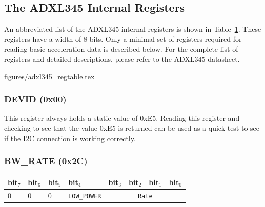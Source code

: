 \documentclass[11pt, twoside, pdftex]{article}
\begin{document}

\subsection{The ADXL345 Internal Registers}
\label{sec:adxl345_internal_registers}

An abbreviated list of the ADXL345 internal registers is shown in Table~\hyperref[tab:adxl345regtable]{1}. These registers have a width of 8 bits. Only a minimal set of registers required for reading basic acceleration data is described below. For the complete list of registers and detailed descriptions, please refer to the ADXL345 datasheet. 


 {figures/adxl345_regtable.tex}

\subsubsection{DEVID (0x00)}

This register always holds a static value of 0xE5. Reading this register and checking to see that the value 0xE5 is returned can be used as a quick test to see if the I2C connection is working correctly.

\subsubsection{BW\_RATE (0x2C)}

\begin{table}[h]
    \centering
    \begin{tabular}{|l|l|l|l|l|l|l|l|}
        \hline
            \textbf{bit$_7$}
            & \textbf{bit$_6$}
            & \textbf{bit$_5$}
            & \textbf{bit$_4$}
            & \textbf{bit$_3$}
            & \textbf{bit$_2$}
            & \textbf{bit$_1$}
            & \textbf{bit$_0$}
        \\\hline
            0
            & 0
            & 0
            & \texttt{LOW\_POWER}
            & \multicolumn{4}{|c|}{\texttt{Rate}}
        \\\hline
    \end{tabular}
\end{table}
\end{document}
